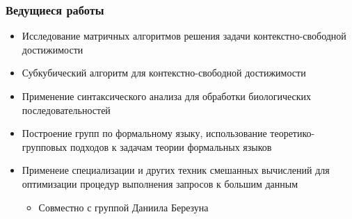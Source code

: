 \documentclass[xcolor=table]{beamer}
\begin{document}
\begin{frame}[fragile]

  \frametitle{Ведущиеся работы}
\begin{itemize}
      \item Исследование матричных алгоритмов решения задачи контекстно-свободной достижимости
      \item Субкубический алгоритм для контекстно-свободной достижимости
      \item Применение синтаксического анализа для обработки биологических последовательностей
      \item Построение групп по формальному языку, использование теоретико-групповых подходов к задачам теории формальных языков
      \item Применеие специализации и других техник смешанных вычислений для оптимизации процедур выполнения запросов к большим данным
      \begin{itemize}
        \item Совместно с группой Даниила Березуна
      \end{itemize}
\end{itemize}
\end{frame}
\end{document}
